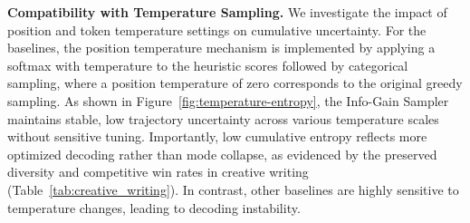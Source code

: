 \noindent\textbf{Compatibility with Temperature Sampling.} 
We investigate the impact of position and token temperature settings on cumulative uncertainty. For the baselines, the position temperature mechanism is implemented by applying a softmax with temperature to the heuristic scores followed by categorical sampling, where a position temperature of zero corresponds to the original greedy sampling.
As shown in Figure~\ref{fig:temperature-entropy}, the Info-Gain Sampler maintains stable, low trajectory uncertainty across various temperature scales without sensitive tuning. Importantly, low cumulative entropy reflects more optimized decoding rather than mode collapse, as evidenced by the preserved diversity and competitive win rates in creative writing (Table~\ref{tab:creative_writing}). In contrast, other baselines are highly sensitive to temperature changes, leading to decoding instability. 